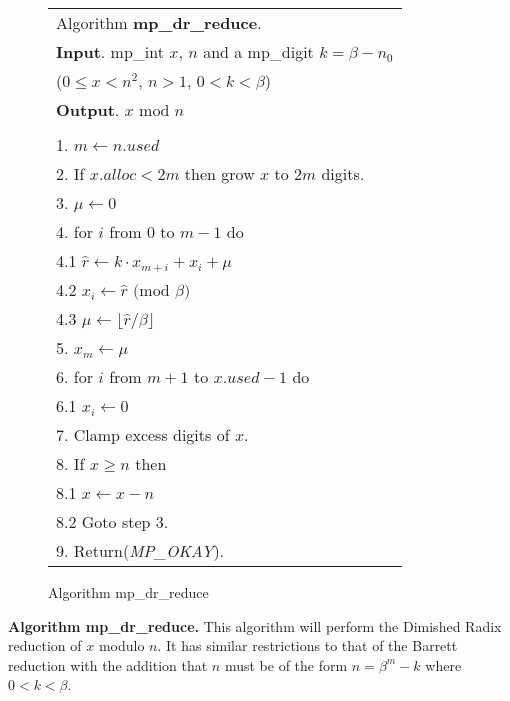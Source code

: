 \documentclass[b5paper]{book}
\begin{document}
\newpage\begin{figure}[!here]
\begin{small}
\begin{center}
\begin{tabular}{l}
\hline Algorithm \textbf{mp\_dr\_reduce}. \\
\textbf{Input}.   mp\_int $x$, $n$ and a mp\_digit $k = \beta - n_0$ \\
\hspace{11.5mm}($0 \le x < n^2$, $n > 1$, $0 < k < \beta$) \\
\textbf{Output}.  $x \mbox{ mod } n$ \\
\hline \\
1.  $m \leftarrow n.used$ \\
2.  If $x.alloc < 2m$ then grow $x$ to $2m$ digits. \\
3.  $\mu \leftarrow 0$ \\
4.  for $i$ from $0$ to $m - 1$ do \\
\hspace{3mm}4.1  $\hat r \leftarrow k \cdot x_{m+i} + x_{i} + \mu$ \\
\hspace{3mm}4.2  $x_{i} \leftarrow \hat r \mbox{ (mod }\beta\mbox{)}$ \\
\hspace{3mm}4.3  $\mu \leftarrow \lfloor \hat r / \beta \rfloor$ \\
5.  $x_{m} \leftarrow \mu$ \\
6.  for $i$ from $m + 1$ to $x.used - 1$ do \\
\hspace{3mm}6.1  $x_{i} \leftarrow 0$ \\
7.  Clamp excess digits of $x$. \\
8.  If $x \ge n$ then \\
\hspace{3mm}8.1  $x \leftarrow x - n$ \\
\hspace{3mm}8.2  Goto step 3. \\
9.  Return(\textit{MP\_OKAY}). \\
\hline
\end{tabular}
\end{center}
\end{small}
\caption{Algorithm mp\_dr\_reduce}
\end{figure}

\textbf{Algorithm mp\_dr\_reduce.}
This algorithm will perform the Dimished Radix reduction of $x$ modulo $n$.  It has similar restrictions to that of the Barrett reduction
with the addition that $n$ must be of the form $n = \beta^m - k$ where $0 < k <\beta$.  
\end{document}
